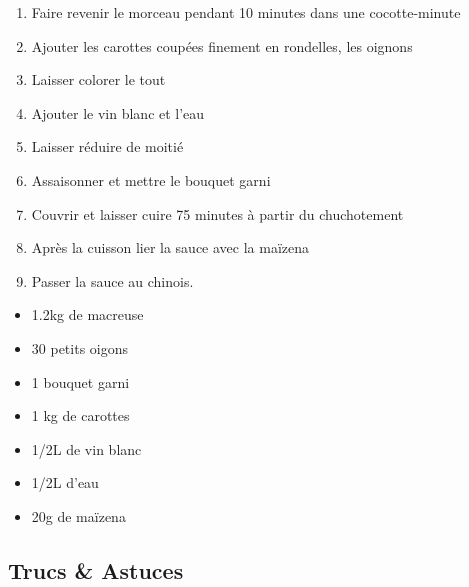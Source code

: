     \begin{minipage}{.7\textwidth}
        \begin{enumerate}
            \item Faire revenir le morceau pendant 10 minutes dans une cocotte-minute
	    \item Ajouter les carottes coupées finement en rondelles, les oignons
	    \item Laisser colorer le tout
	    \item Ajouter le vin blanc et l'eau
	    \item Laisser réduire de moitié
	    \item Assaisonner et mettre le bouquet garni
	    \item Couvrir et laisser cuire 75 minutes à partir du chuchotement
	    \item Après la cuisson lier la sauce avec la maïzena
	    \item Passer la sauce au chinois.

        \end{enumerate}
    \end{minipage}
    \begin{minipage}{.3\textwidth}
        \begin{flushleft}
        \begin{itemize}
            \item 1.2kg de macreuse
	    \item 30 petits oigons
	    \item 1 bouquet garni
	    \item 1 kg de carottes
	    \item 1/2L de vin blanc
	    \item 1/2L d'eau
	    \item 20g de maïzena

        \end{itemize}
        \end{flushleft}
    \end{minipage}
    
    \vspace{1cm}
    \hline
    \vspace{1cm}
    
    \subsection{Trucs \& Astuces}
        
